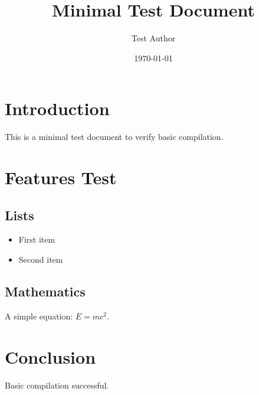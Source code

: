 \documentclass[11pt]{article}
\begin{document}
\title{Minimal Test Document}
\author{Test Author}
\date{\today}
\maketitle

\section{Introduction}
This is a minimal test document to verify basic compilation.

\section{Features Test}

\subsection{Lists}
\begin{itemize}
\item First item
\item Second item
\end{itemize}

\subsection{Mathematics}
A simple equation: $E = mc^2$.

\section{Conclusion}
Basic compilation successful.

\printbibliography
\end{document}
